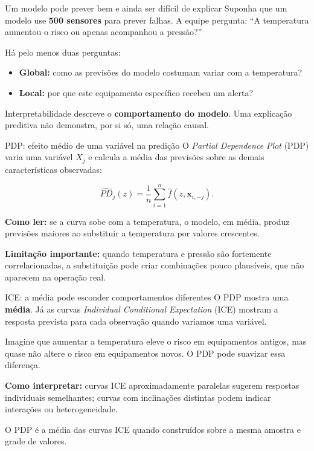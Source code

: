 \documentclass[
  10pt,
  ignorenonframetext,
  aspectratio=169,
  brazilian,
]{beamer}
\providecommand{\tightlist}{%
  \setlength{\itemsep}{0pt}\setlength{\parskip}{0pt}}
\begin{document}
\begin{frame}{Um modelo pode prever bem e ainda ser difícil de explicar}
\protect{}\label{um-modelo-pode-prever-bem-e-ainda-ser-difuxedcil-de-explicar}
Suponha que um modelo use \textbf{500 sensores} para prever falhas. A
equipe pergunta: ``A temperatura aumentou o risco ou apenas acompanhou a
pressão?''

Há pelo menos duas perguntas:

\begin{itemize}
\tightlist
\item
  \textbf{Global:} como as previsões do modelo costumam variar com a
  temperatura?
\item
  \textbf{Local:} por que este equipamento específico recebeu um alerta?
\end{itemize}

Interpretabilidade descreve o \textbf{comportamento do modelo}. Uma
explicação preditiva não demonstra, por si só, uma relação causal.
\end{frame}

\begin{frame}{PDP: efeito médio de uma variável na predição}
\protect{}\label{pdp-efeito-muxe9dio-de-uma-variuxe1vel-na-prediuxe7uxe3o}
O \emph{Partial Dependence Plot} (PDP) varia uma variável \(X_j\) e
calcula a média das previsões sobre as demais características
observadas:

\[
\widehat{PD}_j(z)=\frac{1}{n}\sum_{i=1}^{n}\hat f(z,\mathbf x_{i,-j}).
\]

\textbf{Como ler:} se a curva sobe com a temperatura, o modelo, em
média, produz previsões maiores ao substituir a temperatura por valores
crescentes.

\textbf{Limitação importante:} quando temperatura e pressão são
fortemente correlacionadas, a substituição pode criar combinações pouco
plausíveis, que não aparecem na operação real.
\end{frame}

\begin{frame}{ICE: a média pode esconder comportamentos diferentes}
\protect{}\label{ice-a-muxe9dia-pode-esconder-comportamentos-diferentes}
O PDP mostra uma \textbf{média}. Já as curvas \emph{Individual
Conditional Expectation} (ICE) mostram a resposta prevista para cada
observação quando variamos uma variável.

Imagine que aumentar a temperatura eleve o risco em equipamentos
antigos, mas quase não altere o risco em equipamentos novos. O PDP pode
suavizar essa diferença.

\textbf{Como interpretar:} curvas ICE aproximadamente paralelas sugerem
respostas individuais semelhantes; curvas com inclinações distintas
podem indicar interações ou heterogeneidade.

O PDP é a média das curvas ICE quando construídos sobre a mesma amostra
e grade de valores.
\end{frame}
\end{document}

